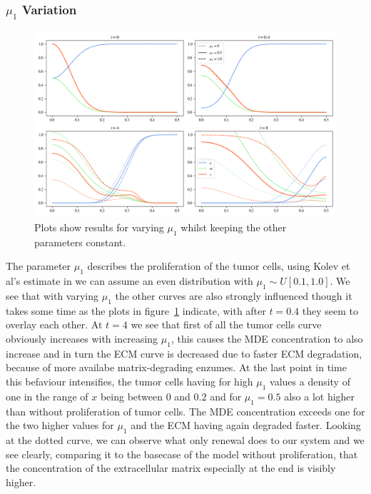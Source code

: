\subsubsection*{$\mu_1$ Variation}
\begin{figure}[h]
    \centering
    \includegraphics[width=\textwidth]{resources/images/prolif_mu_1_variation.png}
    \caption{Plots show results for varying $\mu_1$ whilst keeping the other parameters constant.}
    \label{fig:prolif_mu_1_variation}
\end{figure}

The parameter $\mu_1$ describes the proliferation of the tumor cells, using Kolev et al's estimate in \cite{Kolev2010} we can assume an even distribution with $\mu_1 \sim U[0.1, 1.0]$. We see that with varying $\mu_1$ the other curves are also strongly influenced though it takes some time as the plots in figure~\ref{fig:prolif_mu_1_variation} indicate, with after $t=0.4$ they seem to overlay each other. At $t=4$ we see that first of all the tumor cells curve obviously increases with increasing $\mu_1$, this causes the MDE concentration to also increase and in turn the ECM curve is decreased due to faster ECM degradation, because of more availabe matrix-degrading enzumes. At the last point in time this befaviour intensifies, the tumor cells having for high $\mu_1$ values a density of one in the range of $x$ being between $0$ and $0.2$ and for $\mu_1=0.5$ also a lot higher than without proliferation of tumor cells. The MDE concentration exceeds one for the two higher values for $\mu_1$ and the ECM having again degraded faster. Looking at the dotted curve, we can observe what only renewal does to our system and we see clearly, comparing it to the basecase of the model without proliferation, that the concentration of the extracellular matrix especially at the end is visibly higher.



